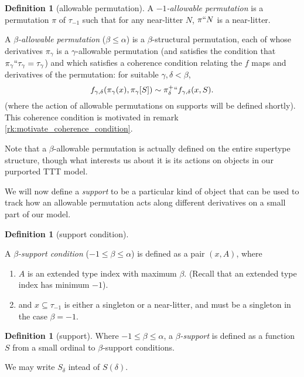\documentclass{article}
\theoremstyle{definition}
\newtheorem{definition}[theorem]{Definition}
\theoremstyle{remark}
\begin{document}
\begin{definition}[allowable permutation]\label{def:allowable_permutation}
A {\em $-1$-allowable permutation\/} is a permutation $\pi$ of $\tau_{-1}$ such that for any near-litter $N$, $\pi``N$ is a near-litter.

A {\em $\beta$-allowable permutation\/} ($\beta \leq \alpha$) is a $\beta$-structural permutation, each of whose derivatives $\pi_\gamma$ is a $\gamma$-allowable permutation (and satisfies the condition that $\pi_\gamma``\tau_\gamma = \tau_\gamma$) and which satisfies a coherence condition relating the $f$ maps and derivatives of the permutation:  for suitable $\gamma,\delta<\beta$, $$f_{\gamma,\delta}(\pi_\gamma(x),\pi_{\gamma}[S]) \sim \pi_\delta^+``f_{\gamma,\delta}(x,S).$$  (where the action of allowable
  permutations on supports will be defined shortly).
  {This coherence condition is motivated in remark \ref{rk:motivate_coherence_condition}.}
\end{definition}

Note that a $\beta$-allowable permutation is actually defined on the entire supertype structure, though what interests us about it is its actions on objects in our purported TTT model.

{We will now define a {\em support\/} to be a particular kind of object that can be used to track how an allowable permutation acts along different derivatives on a small part of our model.}

\begin{definition}[support condition]\label{def:support_condition}

A {\em $\beta$-support condition\/} ($-1 \leq \beta \leq \alpha$) is defined as a pair $(x,A)$, where
\begin{enumerate}

\item {$A$ is an extended type index with maximum $\beta$.  (Recall that an extended type index has minimum $-1$).}

\item

and $x\subseteq \tau_{-1}$ is either a singleton or a near-litter, and must be a singleton in the case $\beta=-1$.

\end{enumerate}
\end{definition}

\begin{definition}[support]\label{def:support}
Where $-1\leq\beta \leq \alpha$, a {\em $\beta$-support\/} is defined as a function $S$ from a small ordinal to $\beta$-support conditions.

We may write $S_\delta$ intead of $S(\delta)$.
\end{definition}
\end{document}
